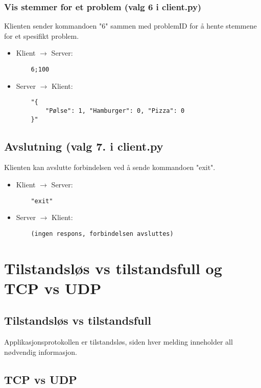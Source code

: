 \documentclass[hidelinks]{article}
\begin{document}
\subsubsection{Vis stemmer for et problem (valg 6 i client.py)}
Klienten sender kommandoen "6" sammen med problemID for å hente stemmene for et spesifikt problem.

\begin{itemize}
    \item Klient \(\rightarrow\) Server:
    \begin{verbatim}
    6;100
    \end{verbatim}
    \item Server \(\rightarrow\) Klient:
    \begin{verbatim}
    "{
        "Pølse": 1, "Hamburger": 0, "Pizza": 0
    }"
\end{verbatim}
\end{itemize}

\subsection{Avslutning (valg 7. i client.py}
Klienten kan avslutte forbindelsen ved å sende kommandoen "exit".

\begin{itemize}
    \item Klient \(\rightarrow\) Server:
    \begin{verbatim}
    "exit"
    \end{verbatim}
     \item Server \(\rightarrow\) Klient:
     \begin{verbatim}
    (ingen respons, forbindelsen avsluttes)
    \end{verbatim}
\end{itemize}

\section{Tilstandsløs vs tilstandsfull og TCP vs UDP}

\subsection{Tilstandsløs vs tilstandsfull}

Applikasjonsprotokollen er tilstandsløs, siden hver melding inneholder all nødvendig informasjon.

\subsection{TCP vs UDP}
\end{document}
